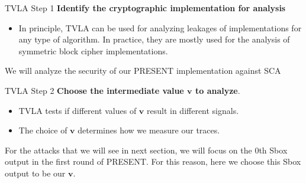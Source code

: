 \begin{frame}{TVLA Step 1}
\textbf{Identify the cryptographic implementation for analysis}
    \begin{itemize}
        \item In principle, TVLA can be used for analyzing leakages of implementations for any type of algorithm.
    In practice, they are mostly used for the analysis of symmetric block cipher implementations.
    \end{itemize}
\begin{example}
    We will analyze the security of our PRESENT implementation against SCA
\end{example}
\end{frame}

\begin{frame}{TVLA Step 2}
    \textbf{Choose the intermediate value $\boldsymbol{v}$ to analyze}.
    \begin{itemize}
        \item  TVLA tests if different values of $\boldsymbol{v}$ result in different signals.
        \item The choice of $\boldsymbol{v}$ determines how we measure our traces.
    \end{itemize}
    \begin{example}
        For the attacks that we will see in next section, we will focus on the $0$th Sbox output in the first round of PRESENT.
        For this reason, here we choose this Sbox output to be our $\boldsymbol{v}$.
    \end{example}
\end{frame}

